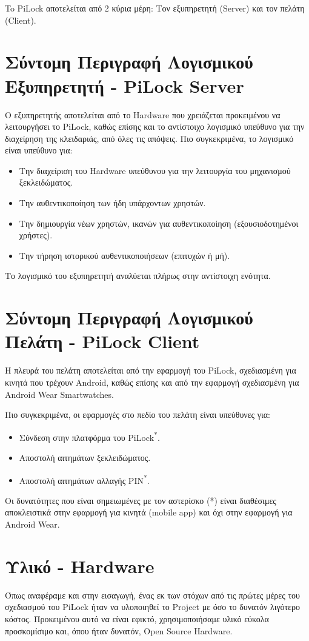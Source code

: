 To PiLock αποτελείται από 2 κύρια μέρη: Τον εξυπηρετητή (Server) και τον πελάτη (Client).

\section{Σύντομη Περιγραφή Λογισμικού Εξυπηρετητή - PiLock Server}
	Ο εξυπηρετητής αποτελείται από το Hardware που χρειάζεται προκειμένου να λειτουργήσει το PiLock, καθώς επίσης και το αντίστοιχο λογισμικό υπεύθυνο για την διαχείρηση της κλειδαριάς, από όλες τις απόψεις. Πιο συγκεκριμένα, το λογισμικό είναι υπεύθυνο για:
	\begin{itemize}
		\item Την διαχείριση του Hardware υπεύθυνου για την λειτουργία του μηχανισμού ξεκλειδώματος.
		\item Την αυθεντικοποίηση των ήδη υπάρχοντων χρηστών.
		\item Την δημιουργία νέων χρηστών, ικανών για αυθεντικοποίηση (εξουσιοδοτημένοι χρήστες).
		\item Την τήρηση ιστορικού αυθεντικοποιήσεων (επιτυχών ή μή).
	\end{itemize}
	Το λογισμικό του εξυπηρετητή αναλύεται πλήρως στην αντίστοιχη ενότητα. %

\section{Σύντομη Περιγραφή Λογισμικού Πελάτη - PiLock Client}
	\label{sec:pilock_client_overview}
	Η πλευρά του πελάτη αποτελείται από την εφαρμογή του PiLock, σχεδιασμένη για κινητά που τρέχουν Android, καθώς επίσης και από την εφαρμογή σχεδιασμένη για Android Wear Smartwatches.

	Πιο συγκεκριμένα, οι εφαρμογές στο πεδίο του πελάτη είναι υπεύθυνες για:

	\begin{itemize}
		\item Σύνδεση στην πλατφόρμα του PiLock\textsuperscript{*}.
		\item Αποστολή αιτημάτων ξεκλειδώματος.
		\item Αποστολή αιτημάτων αλλαγής PIN\textsuperscript{*}.
	\end{itemize}
	{\footnotesize Οι δυνατότητες που είναι σημειωμένες με τον αστερίσκο (*) είναι διαθέσιμες αποκλειστικά στην εφαρμογή για κινητά (mobile app) και όχι στην εφαρμογή για Android Wear.}

\section{Υλικό - Hardware}
	\label{sec:hardw}
	Όπως αναφέραμε και στην εισαγωγή, ένας εκ των στόχων από τις πρώτες μέρες του σχεδιασμού του PiLock ήταν να υλοποιηθεί το Project με όσο το δυνατόν λιγότερο κόστος. Προκειμένου αυτό να είναι εφικτό, χρησιμοποιήσαμε υλικό εύκολα προσκομίσιμο και, όπου ήταν δυνατόν, Open Source Hardware.

